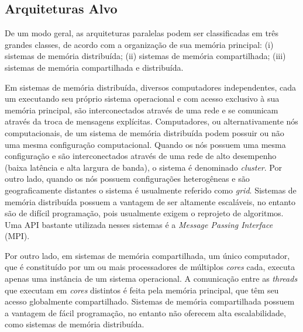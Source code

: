 \documentclass{SBCbookchapter}
\begin{document}
	\subsection{Arquiteturas Alvo}

		De um modo geral, as arquiteturas paralelas podem ser
		classificadas em três grandes classes, de acordo com a
		organização de sua memória principal: (i) sistemas de memória
		distribuída; (ii) sistemas de memória compartilhada; (iii)
		sistemas de memória compartilhada e distribuída.
	
		Em sistemas de memória distribuída, diversos computadores
		independentes, cada um executando seu próprio sistema
		operacional e com acesso exclusivo à sua memória principal, são
		interconectados através de uma rede e se comunicam através da
		troca de mensagens explícitas. Computadores, ou alternativamente
		nós computacionais, de um sistema de memória distribuída podem
		possuir ou não uma mesma configuração computacional. Quando
		os nós possuem uma mesma configuração e são interconectados
		através de uma rede de alto desempenho (baixa latência e alta 
		largura de banda), o sistema é denominado \textit{cluster}. Por outro
		lado, quando os nós possuem configurações heterogêneas e são
		geograficamente distantes o sistema é usualmente referido como
		\textit{grid}. Sistemas de memória distribuída possuem a
		vantagem de ser altamente escaláveis, no entanto são de difícil
		programação, pois usualmente exigem o reprojeto de algoritmos.
		Uma API bastante utilizada nesses sistemas é a \textit{Message
		Passing Interface} (MPI).
		
		Por outro lado, em sistemas de memória compartilhada, um único
		computador, que é constituído por um ou mais processadores de
		múltiplos \textit{cores} cada, executa apenas uma instância de
		um sistema operacional. A comunicação entre as \textit{threads}
		que executam em \textit{cores} distintos é feita pela memória
		principal, que têm seu acesso globalmente compartilhado.
		Sistemas de memória compartilhada possuem a vantagem de fácil
		programação, no entanto não oferecem alta escalabilidade, como
		sistemas de memória distribuída.
            
\end{document}
